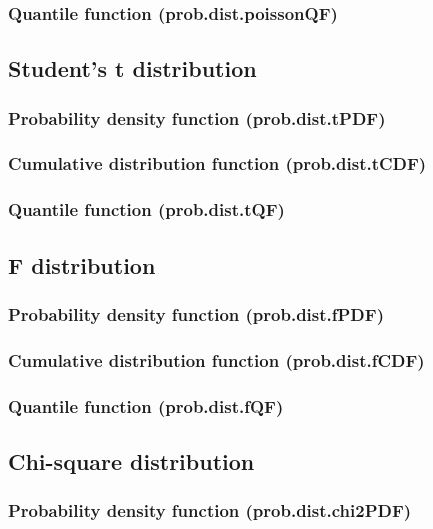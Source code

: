 \documentclass{article}
\theoremstyle{definition}
\begin{document}
\subsubsection{Quantile function (prob.dist.poissonQF)}

\subsection{Student's t distribution}
\subsubsection{Probability density function (prob.dist.tPDF)}
\subsubsection{Cumulative distribution function (prob.dist.tCDF)}
\subsubsection{Quantile function (prob.dist.tQF)}

\subsection{F distribution}
\subsubsection{Probability density function (prob.dist.fPDF)}
\subsubsection{Cumulative distribution function (prob.dist.fCDF)}
\subsubsection{Quantile function (prob.dist.fQF)}

\subsection{Chi-square distribution}
\subsubsection{Probability density function (prob.dist.chi2PDF)}
\end{document}
